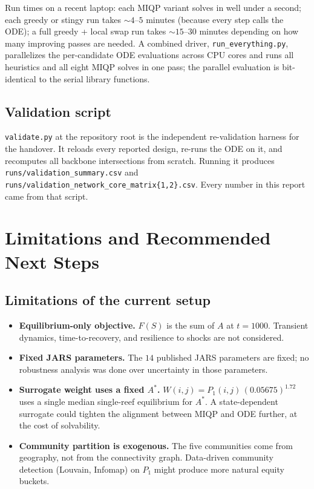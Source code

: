 \documentclass[11pt]{article}
\begin{document}
Run times on a recent laptop: each MIQP variant solves in well under a second; each greedy or stingy run takes $\sim 4$--$5$ minutes (because every step calls the ODE); a full greedy + local swap run takes $\sim 15$--$30$ minutes depending on how many improving passes are needed. A combined driver, \texttt{run\_everything.py}, parallelizes the per-candidate ODE evaluations across CPU cores and runs all heuristics and all eight MIQP solves in one pass; the parallel evaluation is bit-identical to the serial library functions.

\subsection{Validation script}

\texttt{validate.py} at the repository root is the independent re-validation harness for the handover. It reloads every reported design, re-runs the ODE on it, and recomputes all backbone intersections from scratch. Running it produces \texttt{runs/validation\_summary.csv} and \texttt{runs/validation\_network\_core\_matrix\{1,2\}.csv}. Every number in this report came from that script.

\section{Limitations and Recommended Next Steps}

\subsection{Limitations of the current setup}

\begin{itemize}[leftmargin=1.4em, itemsep=0.2em]
  \item \textbf{Equilibrium-only objective.} $F(S)$ is the sum of $A$ at $t=1000$. Transient dynamics, time-to-recovery, and resilience to shocks are not considered.
  \item \textbf{Fixed JARS parameters.} The $14$ published JARS parameters are fixed; no robustness analysis was done over uncertainty in those parameters.
  \item \textbf{Surrogate weight uses a fixed $A^*$.} $W(i,j) = P_1(i,j)\,(0.05675)^{1.72}$ uses a single median single-reef equilibrium for $A^*$. A state-dependent surrogate could tighten the alignment between MIQP and ODE further, at the cost of solvability.
  \item \textbf{Community partition is exogenous.} The five communities come from geography, not from the connectivity graph. Data-driven community detection (Louvain, Infomap) on $P_1$ might produce more natural equity buckets.
\end{itemize}
\end{document}
